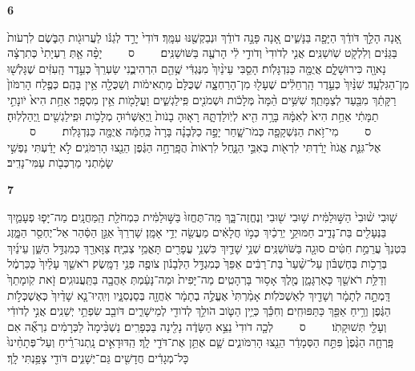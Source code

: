 \documentclass[a4paper]{article}
\newcommand{\rdrchap}[1]{\begin{english}\setRL\small\textbf{#1}\end{english}}
\newcommand{\rdrverse}[1]{\raisebox{2.5pt}{\smaller[4]#1}}
\newcommand{\setuma}{~~~~{\scriptsize ס}~~~~}
\begin{document}
\begin{hebrew}
\begin{multicols}{2}
\rdrchap{6}\rdrverse{1} אָ֚נָה הָלַ֣ךְ דֹּודֵ֔ךְ הַיָּפָ֖ה בַּנָּשִׁ֑ים אָ֚נָה פָּנָ֣ה דֹודֵ֔ךְ וּנְבַקְשֶׁ֖נּוּ עִמָּֽךְ׃ 
\rdrverse{2} דֹּודִי֙ יָרַ֣ד לְגַנֹּ֔ו לַעֲרוּגֹ֖ות הַבֹּ֑שֶׂם לִרְעֹות֙ בַּגַּנִּ֔ים וְלִלְקֹ֖ט שֹֽׁושַׁנִּֽים׃ 
\rdrverse{3} אֲנִ֤י לְדֹודִי֙ וְדֹודִ֣י לִ֔י הָרֹעֶ֖ה בַּשֹּׁושַׁנִּֽים׃ \setuma{} 
\rdrverse{4} יָפָ֨ה אַ֤תְּ רַעְיָתִי֙ כְּתִרְצָ֔ה נָאוָ֖ה כִּירוּשָׁלִָ֑ם אֲיֻמָּ֖ה כַּנִּדְגָּלֹֽות׃ 
\rdrverse{5} הָסֵ֤בִּי עֵינַ֨יִךְ֙ מִנֶּגְדִּ֔י שֶׁ֥הֵ֖ם הִרְהִיבֻ֑נִי שַׂעְרֵךְ֙ כְּעֵ֣דֶר הָֽעִזִּ֔ים שֶׁגָּלְשׁ֖וּ מִן־הַגִּלְעָֽד׃ 
\rdrverse{6} שִׁנַּ֨יִךְ֙ כְּעֵ֣דֶר הָֽרְחֵלִ֔ים שֶׁעָל֖וּ מִן־הָרַחְצָ֑ה שֶׁכֻּלָּם֙ מַתְאִימֹ֔ות וְשַׁכֻּלָ֖ה אֵ֥ין בָּהֶֽם׃ 
\rdrverse{7} כְּפֶ֤לַח הָרִמֹּון֙ רַקָּתֵ֔ךְ מִבַּ֖עַד לְצַמָּתֵֽךְ׃ 
\rdrverse{8} שִׁשִּׁ֥ים הֵ֨מָּה֙ מְּלָכֹ֔ות וּשְׁמֹנִ֖ים פִּֽילַגְשִׁ֑ים וַעֲלָמֹ֖ות אֵ֥ין מִסְפָּֽר׃ 
\rdrverse{9} אַחַ֥ת הִיא֙ יֹונָתִ֣י תַמָּתִ֔י אַחַ֥ת הִיא֙ לְאִמָּ֔הּ בָּרָ֥ה הִ֖יא לְיֹֽולַדְתָּ֑הּ רָא֤וּהָ בָנֹות֙ וַֽיְאַשְּׁר֔וּהָ מְלָכֹ֥ות וּפִֽילַגְשִׁ֖ים וַֽיְהַלְלֽוּהָ׃ \setuma{} 
\rdrverse{10} מִי־זֹ֥את הַנִּשְׁקָפָ֖ה כְּמֹו־שָׁ֑חַר יָפָ֣ה כַלְּבָנָ֗ה בָּרָה֙ כַּֽחַמָּ֔ה אֲיֻמָּ֖ה כַּנִּדְגָּלֹֽות׃ \setuma{} 
\rdrverse{11} אֶל־גִּנַּ֤ת אֱגֹוז֙ יָרַ֔דְתִּי לִרְאֹ֖ות בְּאִבֵּ֣י הַנָּ֑חַל לִרְאֹות֙ הֲפָֽרְחָ֣ה הַגֶּ֔פֶן הֵנֵ֖צוּ הָרִמֹּנִֽים׃ 
\rdrverse{12} לֹ֣א יָדַ֔עְתִּי נַפְשִׁ֣י שָׂמַ֔תְנִי מַרְכְּבֹ֖ות עַמִּי־נָדִֽיב׃ 


\rdrchap{7}\rdrverse{1} שׁ֤וּבִי שׁ֨וּבִי֙ הַשּׁ֣וּלַמִּ֔ית שׁ֥וּבִי שׁ֖וּבִי וְנֶחֱזֶה־בָּ֑ךְ מַֽה־תֶּחֱזוּ֙ בַּשּׁ֣וּלַמִּ֔ית כִּמְחֹלַ֖ת הַֽמַּחֲנָֽיִם׃ 
\rdrverse{2} מַה־יָּפ֧וּ פְעָמַ֛יִךְ בַּנְּעָלִ֖ים בַּת־נָדִ֑יב חַמּוּקֵ֣י יְרֵכַ֔יִךְ כְּמֹ֣ו חֲלָאִ֔ים מַעֲשֵׂ֖ה יְדֵ֥י אָמָּֽן׃ 
\rdrverse{3} שָׁרְרֵךְ֙ אַגַּ֣ן הַסַּ֔הַר אַל־יֶחְסַ֖ר הַמָּ֑זֶג בִּטְנֵךְ֙ עֲרֵמַ֣ת חִטִּ֔ים סוּגָ֖ה בַּשֹּׁושַׁנִּֽים׃ 
\rdrverse{4} שְׁנֵ֥י שָׁדַ֛יִךְ כִּשְׁנֵ֥י עֳפָרִ֖ים תָּאֳמֵ֥י צְבִיָּֽה׃ 
\rdrverse{5} צַוָּארֵ֖ךְ כְּמִגְדַּ֣ל הַשֵּׁ֑ן עֵינַ֜יִךְ בְּרֵכֹ֣ות בְּחֶשְׁבֹּ֗ון עַל־שַׁ֨עַר֙ בַּת־רַבִּ֔ים אַפֵּךְ֙ כְּמִגְדַּ֣ל הַלְּבָנֹ֔ון צֹופֶ֖ה פְּנֵ֥י דַמָּֽשֶׂק׃ 
\rdrverse{6} רֹאשֵׁ֤ךְ עָלַ֨יִךְ֙ כַּכַּרְמֶ֔ל וְדַלַּ֥ת רֹאשֵׁ֖ךְ כָּאַרְגָּמָ֑ן מֶ֖לֶךְ אָס֥וּר בָּרְהָטִֽים׃ 
\rdrverse{7} מַה־יָּפִית֙ וּמַה־נָּעַ֔מְתְּ אַהֲבָ֖ה בַּתַּֽעֲנוּגִֽים׃ 
\rdrverse{8} זֹ֤את קֹֽומָתֵךְ֙ דָּֽמְתָ֣ה לְתָמָ֔ר וְשָׁדַ֖יִךְ לְאַשְׁכֹּלֹֽות׃ 
\rdrverse{9} אָמַ֨רְתִּי֙ אֶעֱלֶ֣ה בְתָמָ֔ר אֹֽחֲזָ֖ה בְּסַנְסִנָּ֑יו וְיִֽהְיוּ־נָ֤א שָׁדַ֨יִךְ֙ כְּאֶשְׁכְּלֹ֣ות הַגֶּ֔פֶן וְרֵ֥יחַ אַפֵּ֖ךְ כַּתַּפּוּחִֽים׃ 
\rdrverse{10} וְחִכֵּ֕ךְ כְּיֵ֥ין הַטֹּ֛וב הֹולֵ֥ךְ לְדֹודִ֖י לְמֵישָׁרִ֑ים דֹּובֵ֖ב שִׂפְתֵ֥י יְשֵׁנִֽים׃ 
\rdrverse{11} אֲנִ֣י לְדֹודִ֔י וְעָלַ֖י תְּשׁוּקָתֹֽו׃ \setuma{} 
\rdrverse{12} לְכָ֤ה דֹודִי֙ נֵצֵ֣א הַשָּׂדֶ֔ה נָלִ֖ינָה בַּכְּפָרִֽים׃ 
\rdrverse{13} נַשְׁכִּ֨ימָה֙ לַכְּרָמִ֔ים נִרְאֶ֞ה אִם פָּֽרְחָ֤ה הַגֶּ֨פֶן֙ פִּתַּ֣ח הַסְּמָדַ֔ר הֵנֵ֖צוּ הָרִמֹּונִ֑ים שָׁ֛ם אֶתֵּ֥ן אֶת־דֹּדַ֖י לָֽךְ׃ 
\rdrverse{14} הַֽדּוּדָאִ֣ים נָֽתְנוּ־רֵ֗יחַ וְעַל־פְּתָחֵ֨ינוּ֙ כָּל־מְגָדִ֔ים חֲדָשִׁ֖ים גַּם־יְשָׁנִ֑ים דֹּודִ֖י צָפַ֥נְתִּי לָֽךְ׃ 



\end{multicols}
\end{hebrew}
\end{document}
